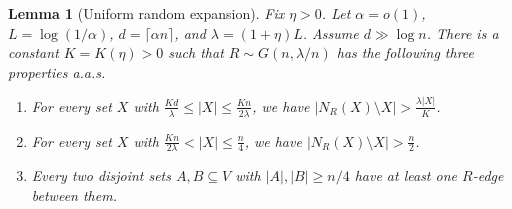 \documentclass[11pt,reqno]{amsart}
\newtheorem{lemma}[theorem]{Lemma}
\theoremstyle{definition}
\theoremstyle{remark}
\renewcommand\le{\leqslant}
\renewcommand\ge{\geqslant}
\begin{document}
\begin{lemma}[Uniform random expansion]\label{lem:expansion}
Fix $\eta>0$. Let $\alpha=o(1)$, $L=\log(1/\alpha)$, $d=\lceil\alpha n\rceil$, and $\lambda=(1+\eta)L$. Assume $d\gg \log n$. There is a constant $K=K(\eta)>0$ such that $R\sim G(n,\lambda/n)$ has the following three properties a.a.s.
\begin{enumerate}[label=\textnormal{(E\arabic*)}]
    \item \label{E1} For every set $X$ with $\frac{Kd}{\lambda}\le|X|\le\frac{Kn}{2\lambda}$, we have $|N_{R}(X)\setminus X|>\frac{\lambda|X|}{K}$.
    \item \label{E2} For every set $X$ with $\frac{Kn}{2\lambda}<|X|\le\frac{n}{4}$, we have $|N_{R}(X)\setminus X|>\frac{n}{2}$.
    \item \label{E3} Every two disjoint sets $A, B\subseteq V$ with $|A|,|B|\ge n/4$ have at least one $R$-edge between them.
\end{enumerate}
\end{lemma}
\end{document}
